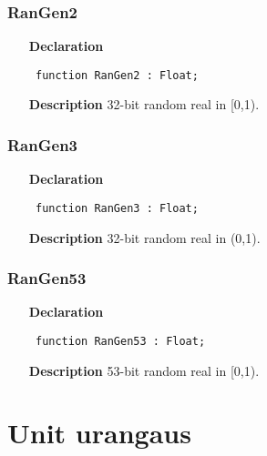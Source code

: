 \documentclass[12pt,a4paper,oneside]{report}
\newcommand{\declarationitem}[1]{\textbf{#1}}
\newcommand{\descriptiontitle}[1]{\textbf{#1}}
\newcommand{\code}[1]{\texttt{#1}}
\begin{document}
\subsubsection{RanGen2}
\label{urandom-RanGen2}
\begin{itemize}\item[\declarationitem{Declaration}\hfill]
	\begin{flushleft}
		\code{
			function RanGen2 : Float;}
		
	\end{flushleft}
	
	\par
	\item[\descriptiontitle{Description}]
	32-bit random real in [0,1).
	
\end{itemize}
\subsubsection{RanGen3}
\label{urandom-RanGen3}
\begin{itemize}\item[\declarationitem{Declaration}\hfill]
	\begin{flushleft}
		\code{
			function RanGen3 : Float;}
		
	\end{flushleft}
	
	\par
	\item[\descriptiontitle{Description}]
	32-bit random real in (0,1).
	
\end{itemize}
\subsubsection{RanGen53}
\label{urandom-RanGen53}
\begin{itemize}\item[\declarationitem{Declaration}\hfill]
	\begin{flushleft}
		\code{
			function RanGen53 : Float;}
		
	\end{flushleft}
	
	\par
	\item[\descriptiontitle{Description}]
	53-bit random real in [0,1).
	
\end{itemize}
\section{Unit urangaus}
\label{urangaus}
\end{document}
